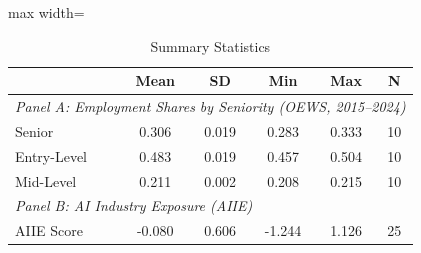 \begin{table}[htbp]
\centering
\caption{Summary Statistics}
\label{tab:summary}
\begin{adjustbox}{max width=\textwidth}
\begin{tabular}{lccccc}
\hline\hline
 & Mean & SD & Min & Max & N \\
\hline
\multicolumn{6}{l}{\textit{Panel A: Employment Shares by Seniority (OEWS, 2015--2024)}} \\
Senior & 0.306 & 0.019 & 0.283 & 0.333 & 10 \\
Entry-Level & 0.483 & 0.019 & 0.457 & 0.504 & 10 \\
Mid-Level & 0.211 & 0.002 & 0.208 & 0.215 & 10 \\
\hline
\multicolumn{6}{l}{\textit{Panel B: AI Industry Exposure (AIIE)}} \\
AIIE Score & -0.080 & 0.606 & -1.244 & 1.126 & 25 \\
\hline\hline
\end{tabular}
\end{adjustbox}
\end{table}
